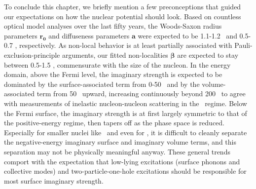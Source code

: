 To conclude this chapter, we briefly mention a few preconceptions
that guided our expectations on how the nuclear potential should look. Based on
countless optical model analyses over the last fifty years, the Woods-Saxon radius
parameters $\bm{r_{0}}$ and diffuseness parameters $\bm{a}$
were expected to be 1.1-1.2
\femto\meter\ and 0.5-0.7 \femto\meter, respectively. As non-local behavior is at
least partially associated with Pauli-exclusion-principle arguments, our fitted
non-localities $\bm{\beta}$
are expected to stay between 0.5-1.5 \femto\meter, commensurate with the size of the
nucleon. In the energy domain, above the Fermi level,
the imaginary strength is expected to be dominated by the surface-associated term from
0-50 \mega\electronvolt\ and by the volume-associated term from 50
\mega\electronvolt\ upward, increasing continuously beyond 200
\mega\electronvolt\ to agree with
measurements of inelastic nucleon-nucleon scattering in the \giga\electronvolt\ regime.
Below the Fermi surface, the imaginary strength is at first largely symmetric
to that of the positive-energy
regime, then tapers off as the phase space is reduced. Especially for smaller
nuclei like \oSix\ and even for \caForty, it is difficult to cleanly separate the negative-energy 
imaginary surface and imaginary volume terms, and this separation may not be physically
meaningful anyway. These general trends comport with the expectation
that low-lying excitations (surface phonons and collective modes) and
two-particle-one-hole excitations should be responsible for most surface imaginary strength.


